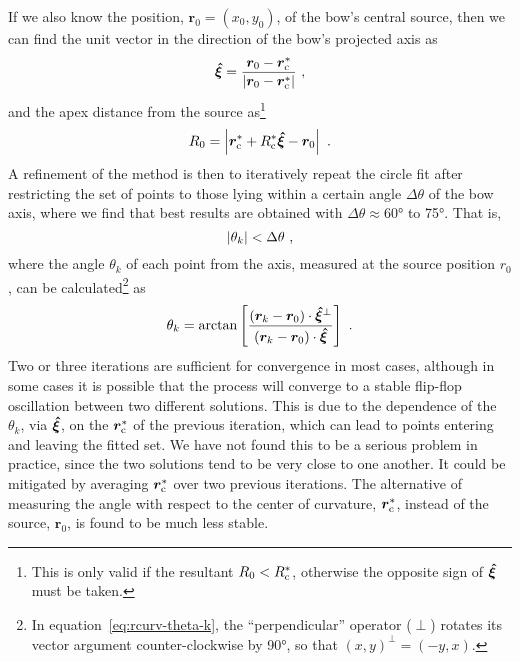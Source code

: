 If we also know the position, \(\bm{r}_0 = (x_0, y_0)\), of the bow's
central source, then we can find the unit vector in the direction of
the bow's projected axis as
\begin{equation}
  \label{eq:rcurv-axis-vector}
  \bm{\hat{\xi}} = \frac {\bm{r}_0 - \bm{r}_{\mathrm{c}}^*} { \lvert\bm{r}_0 - \bm{r}_{\mathrm{c}}^*\rvert} \ , 
\end{equation}
and the apex distance from the source as\footnote{%
  This is only valid if the resultant \(R_0 < R_{\mathrm{c}}^*\), otherwise
  the opposite sign of \(\bm{\hat{\xi}}\) must be taken.}
\begin{equation}
  \label{eq:rcurv-apex-distance}
  R_0 = \Abs{\bm{r}_{\C}^* + R_{\C}^* \uvec{\xi} - \bm{r}_0} \ .
\end{equation}
A refinement of the method is then to iteratively repeat the circle
fit after restricting the set of points to those lying within a
certain angle \(\Delta\theta\) of the bow axis, where we find that best results
are obtained with \(\Delta\theta \approx \ang{60}\) to \ang{75}.  That is, 
\begin{equation}
  \label{eq:rcurv-delta-theta}
  \left\lvert\theta_k\right\rvert < \Delta\theta \ , 
\end{equation}
where the angle \(\theta_k\) of each point from the axis, measured at the
source position \(r_0\), can be calculated\footnote{%
  In equation~\eqref{eq:rcurv-theta-k}, the ``perpendicular'' operator
  (\(\perp\)) rotates its vector argument counter-clockwise by \ang{90},
  so that \((x, y)^\perp = (-y, x)\).} %
as
\begin{equation}
  \label{eq:rcurv-theta-k}
  \theta_k = \arctan \left[  
    \frac{\left( \bm{r}_k - \bm{r}_0 \right) \cdot \bm{\hat{\xi}}^\perp}
    {\left( \bm{r}_k - \bm{r}_0 \right) \cdot \bm{\hat{\xi}}}
  \right] \ .
\end{equation}
Two or three iterations are sufficient for convergence in most cases,
although in some cases it is possible that the process will converge
to a stable flip-flop oscillation between two different solutions.
This is due to the dependence of the \(\theta_k\), via \(\bm{\hat{\xi}}\), on
the \(\bm{r}_{\mathrm{c}}^*\) of the previous iteration, which can lead to
points entering and leaving the fitted set.  We have not found this to
be a serious problem in practice, since the two solutions tend to be
very close to one another.  It could be mitigated by averaging
\(\bm{r}_{\mathrm{c}}^*\) over two previous iterations.  The alternative of
measuring the angle with respect to the center of curvature,
\(\bm{r}_{\mathrm{c}}^*\), instead of the source, \(\bm{r}_0\), is found to be
much less stable.

